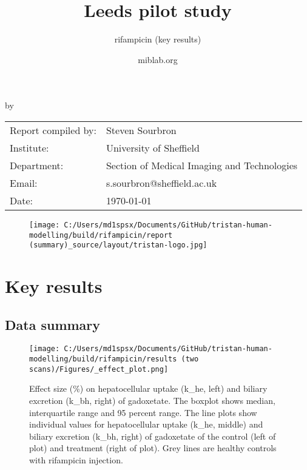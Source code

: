 \documentclass{epflreport}%
\begin{document}
%
\normalsize%
\frontmatter%
\title{Leeds pilot study}%
\subtitle{rifampicin (key results)}%
\author{miblab.org}%
\subject{D2.13 {-} Internal report}%
%
%
%
\makecover%
\begin{titlepage}%
\begin{center}%
\makeatletter%
\largetitlestyle\fontsize{45}{45}\selectfont\@title%
\makeatother%
\linebreak%
\makeatletter%
\ifdefvoid{\@subtitle}{}{\bigskip\titlestyle\fontsize{20}{20}\selectfont\@subtitle}%
\makeatother%
\linebreak%
\bigskip%
\bigskip%
by%
\linebreak%
\bigskip%
\bigskip%
\makeatletter%
\largetitlestyle\fontsize{25}{25}\selectfont\@author%
\makeatother%
\vfill%
\large%
\begin{tabular}{ll}%
\hline%
Report compiled by: &Steven Sourbron\\%
Institute: &University of Sheffield\\%
Department: &Section of Medical Imaging and Technologies\\%
Email: &s.sourbron@sheffield.ac.uk\\%
Date: &\today\\%
\hline%
\end{tabular}%


\begin{figure}[b!]%
\centering%
\centering%
\texttt{[image: C:/Users/md1spsx/Documents/GitHub/tristan-human-modelling/build/rifampicin/report (summary)\_source/layout/tristan-logo.jpg]}%
\end{figure}

%
\end{center}%
\end{titlepage}%
\newpage%
\tableofcontents%
\mainmatter%
\clearpage%
\chapter{Key results}%
\section{Data summary}%
\label{sec:Datasummary}%

%


\begin{figure}[h!]%
\centering%
\texttt{[image: C:/Users/md1spsx/Documents/GitHub/tristan-human-modelling/build/rifampicin/results (two scans)/Figures/\_effect\_plot.png]}%
\caption{Effect size (\%) on hepatocellular uptake (k\_he, left) and biliary excretion (k\_bh, right) of gadoxetate. The boxplot shows median, interquartile range and 95 percent range. The line plots show individual values for hepatocellular uptake (k\_he, middle) and biliary excretion (k\_bh, right) of gadoxetate of the control (left of plot) and treatment (right of plot). Grey lines are healthy controls with rifampicin injection.}%
\end{figure}
\end{document}
